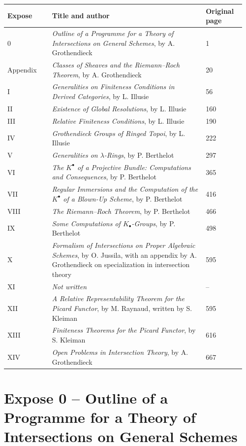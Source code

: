 \documentclass[11pt]{article}
\theoremstyle{plain}
\theoremstyle{definition}
\theoremstyle{remark}
\begin{document}
\begin{longtable}{p{0.18\linewidth}p{0.62\linewidth}p{0.16\linewidth}}
\toprule
Expose & Title and author & Original page \\
\midrule
0 & \emph{Outline of a Programme for a Theory of Intersections on General Schemes}, by A. Grothendieck & 1 \\
Appendix & \emph{Classes of Sheaves and the Riemann--Roch Theorem}, by A. Grothendieck & 20 \\
I & \emph{Generalities on Finiteness Conditions in Derived Categories}, by L. Illusie & 56 \\
II & \emph{Existence of Global Resolutions}, by L. Illusie & 160 \\
III & \emph{Relative Finiteness Conditions}, by L. Illusie & 190 \\
IV & \emph{Grothendieck Groups of Ringed Topoi}, by L. Illusie & 222 \\
V & \emph{Generalities on $\lambda$-Rings}, by P. Berthelot & 297 \\
VI & \emph{The $K^{\bullet}$ of a Projective Bundle: Computations and Consequences}, by P. Berthelot & 365 \\
VII & \emph{Regular Immersions and the Computation of the $K^{\bullet}$ of a Blown-Up Scheme}, by P. Berthelot & 416 \\
VIII & \emph{The Riemann--Roch Theorem}, by P. Berthelot & 466 \\
IX & \emph{Some Computations of $K_{\bullet}$-Groups}, by P. Berthelot & 498 \\
X & \emph{Formalism of Intersections on Proper Algebraic Schemes}, by O. Jussila, with an appendix by A. Grothendieck on specialization in intersection theory & 595 \\
XI & \emph{Not written} & -- \\
XII & \emph{A Relative Representability Theorem for the Picard Functor}, by M. Raynaud, written by S. Kleiman & 595 \\
XIII & \emph{Finiteness Theorems for the Picard Functor}, by S. Kleiman & 616 \\
XIV & \emph{Open Problems in Intersection Theory}, by A. Grothendieck & 667 \\
\bottomrule
\end{longtable}

\newpage

\section{Expose 0 -- Outline of a Programme for a Theory of Intersections on General Schemes}
\end{document}
